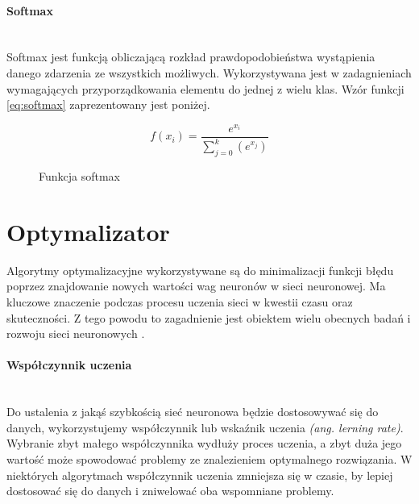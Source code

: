 \paragraph{Softmax} \mbox{}\\
Softmax jest funkcją obliczającą rozkład prawdopodobieństwa wystąpienia danego zdarzenia
ze wszystkich możliwych. Wykorzystywana jest w zadagnieniach wymagających przyporządkowania
elementu do jednej z wielu klas. Wzór funkcji \ref{eq:softmax} zaprezentowany jest poniżej.
\begin{figure}[h!]
\renewcommand{\figurename}{Wzór}%
\begin{equation} \label{eq:softmax}
f(x_{i}) = \frac{e^{x_{i}}} {\sum_{j = 0}^{k}(e^{x_{j}})}
\end{equation}
\caption{Funkcja softmax}
\end{figure}

\section{Optymalizator}

Algorytmy optymalizacyjne wykorzystywane są do minimalizacji funkcji błędu poprzez
znajdowanie nowych wartości wag neuronów w sieci neuronowej. Ma kluczowe
znaczenie podczas procesu uczenia sieci w kwestii czasu oraz skuteczności.
Z tego powodu to zagadnienie jest obiektem wielu obecnych badań i rozwoju sieci
neuronowych \cite{typesOfOptimizationAlgorithms}.

\paragraph{Współczynnik uczenia} \mbox{}\\
Do ustalenia z jakąś szybkością sieć neuronowa będzie dostosowywać się do danych, wykorzystujemy
współczynnik lub wskaźnik uczenia \textit{(ang. lerning rate)}. Wybranie zbyt małego
współczynnika wydłuży proces uczenia, a zbyt duża jego wartość może spowodować problemy
ze znalezieniem optymalnego rozwiązania. W niektórych algorytmach współczynnik uczenia
zmniejsza się w czasie, by lepiej dostosować się do danych i zniwelować oba wspomniane problemy.

